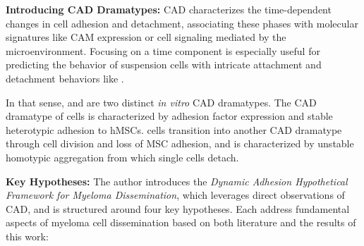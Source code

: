 \textbf{Introducing CAD Dramatypes:}
\acf{CAD} characterizes the time-dependent changes in cell
adhesion and detachment, associating these phases with molecular signatures like
\ac{CAM} expression or cell signaling mediated by the microenvironment. Focusing
on a time component is especially useful for predicting the behavior of
suspension cells with intricate attachment and detachment behaviors like \INA.

In that sense, \MAina and \nMAina are two distinct \textit{in vitro} \ac{CAD}
dramatypes. The \ac{CAD} dramatype of \MAina cells is characterized by adhesion
factor expression and stable heterotypic adhesion to \acp{hMSC}. \MAina cells
transition into another \ac{CAD} dramatype \dashed{\nMAina} through cell
division and loss of MSC adhesion, and is characterized by unstable homotypic
aggregation from which single cells detach.


\textbf{Key Hypotheses:}
The author introduces the \emph{Dynamic Adhesion Hypothetical Framework for
    Myeloma Dissemination}, which leverages direct observations of
\ac{CAD}, and is structured around four key hypotheses. Each
address fundamental aspects of myeloma cell dissemination based on both
literature and the results of this work:



\newcommand{\caddadaptation}{ %
    \ac{CAD} changes dramatypes\footref{foot:caddt} in response to different environmental cues faced
    during dissemination %
}
\newcommand{\caddadaptationtitle}{ %
    \textit{Hypothesis 1}: \acl{CAD} (\acs{CAD}) is Adapted during Dissemination%
}%


\newcommand{\caddadaptibility}{ %
    Rapid of \ac{CAD} adaptability is a hallmark of aggressive myeloma %
}%
\newcommand{\caddadaptabilitytitle}{ %
    \textit{Hypothesis 2}: Rapid CAD Adaptability is a Hallmark of
    Aggressive Myeloma %
}%



\newcommand{\cadddiversity}{%
    \ac{CAD} is highly diverse within both patients and cell lines %
}%
\newcommand{\cadddiversitytitle}{ %
    \textit{Hypothesis 3}: CAD is Highly Diverse Within both Patients
    and Cell Lines%
}%


\newcommand{\caddtrigger}{%
    Detachment is caused by multiple cues of varying nature, including
    external mechanical forces, cell division, loss of \ac{CAM} expression, or
    even pure chance. }%
\newcommand{\caddtriggertitle}{ %
    \textit{Hypothesis 4}: Detachment is Caused by Multiple Cues of Varying
    Nature %
}%



